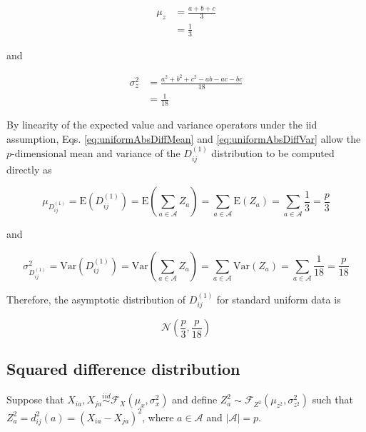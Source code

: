 \documentclass[10pt,letterpaper]{article}\usepackage[]{graphicx}\usepackage[]{color}
\begin{document}
\begin{equation}\label{eq:uniformAbsDiffMean}
\begin{aligned}
\mu_z &= \frac{a + b + c}{3} \\
&= \frac{1}{3}
\end{aligned}
\end{equation}

\noindent and

\begin{equation}\label{eq:uniformAbsDiffVar}
\begin{aligned}
\sigma^2_z &= \frac{a^2 + b^2 + c^2 - ab - ac - bc}{18} \\
&= \frac{1}{18}
\end{aligned}
\end{equation}

By linearity of the expected value and variance operators under the iid assumption, Eqs. \ref{eq:uniformAbsDiffMean} and \ref{eq:uniformAbsDiffVar} allow the $p \text{-dimensional}$ mean and variance of the $D^{(1)}_{ij}$ distribution to be computed directly as

\begin{equation}\label{eq:uniformManMean}
\mu_{D^{(1)}_{ij}} = \text{E}\left(D^{(1)}_{ij}\right) = \text{E}\left(\sum_{a \in \mathcal{A}}Z_a\right) = \sum_{a \in \mathcal{A}} \text{E}(Z_a) = \sum_{a \in \mathcal{A}}\frac{1}{3} = \frac{p}{3}
\end{equation}

\noindent and

\begin{equation}\label{eq:uniformManVar}
\sigma^2_{D^{(1)}_{ij}} = \text{Var}\left(D^{(1)}_{ij}\right) = \text{Var}\left(\sum_{a \in \mathcal{A}} Z_a\right) = \sum_{a \in \mathcal{A}} \text{Var}\left(Z_a\right) = \sum_{a \in \mathcal{A}} \frac{1}{18} = \frac{p}{18}
\end{equation}

Therefore, the asymptotic distribution of $D^{(1)}_{ij}$ for standard uniform data is

\begin{equation}\label{eq:uniformManDistr}
\mathcal{N}\left(\frac{p}{3},\frac{p}{18}\right)
\end{equation}

\subsection{Squared difference distribution}

Suppose that $X_{ia}, X_{ja} \overset{iid}{\sim} \mathcal{F}_X(\mu_x,\sigma^2_x)$ and define $Z^2_a \sim \mathcal{F}_{Z^2}(\mu_{z^2},\sigma^2_{z^2})$ such that $Z^2_a = d^2_{ij}(a) = (X_{ia} - X_{ja})^2$, where $a \in \mathcal{A}$ and $|\mathcal{A}| = p$.
\end{document}
